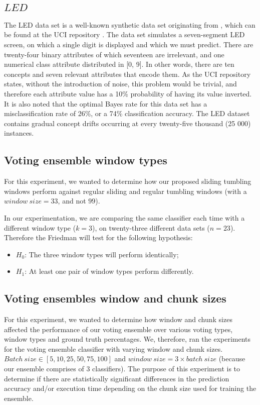
\subsection{$LED$}
The LED data set is a well-known synthetic data set originating from \cite{breiman1984classification}, which can be found at the UCI repository \cite{blake1999uci}. The data set simulates a seven-segment LED screen, on which a single digit is displayed and which we must predict. There are twenty-four binary attributes of which seventeen are irrelevant, and one numerical class attribute distributed in [0, 9]. In other words, there are ten concepts and seven relevant attributes that encode them. As the UCI repository states, without the introduction of noise, this problem would be trivial, and therefore each attribute value has a 10\% probability of having its value inverted. It is also noted that the optimal Bayes rate for this data set has a misclassification rate of 26\%, or a 74\% classification accuracy. The LED dataset contains gradual concept drifts occurring at every twenty-five thousand (25 000) instances.



\subsection{Voting ensemble window types}
For this experiment, we wanted to determine how our proposed sliding tumbling windows perform against regular sliding and regular tumbling windows (with a $window\ size=33$, and not $99$).

In our experimentation, we are comparing the same classifier each time with a different window type ($k=3$), on twenty-three different data sets ($n=23$). Therefore the Friedman will test for the following hypothesis:
\begin{itemize}
\item $H_0$: The three window types will perform identically;
\item $H_1$: At least one pair of window types perform differently.
\end{itemize}

\subsection{Voting ensembles window and chunk sizes}
For this experiment, we wanted to determine how window and chunk sizes affected the performance of our voting ensemble over various voting types, window types and ground truth percentages. We, therefore, ran the experiments for the voting ensemble classifier with varying window and chunk sizes. $Batch\ size \in [5, 10, 25, 50, 75, 100]$ and $window\ size = 3\times batch\ size$ (because our ensemble comprises of 3 classifiers).
The purpose of this experiment is to determine if there are statistically significant differences in the prediction accuracy and/or execution time depending on the chunk size used for training the ensemble.

